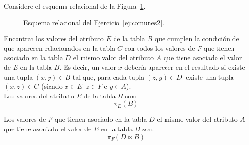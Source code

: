 \documentclass[12pt]{article}
\begin{document}
\begin{ejercicio}[AR]\label{ej:comunes2}
    Considere el esquema relacional de la Figura~\ref{fig:comunes2}.
    \begin{figure}[H]
        \centering
        \caption{Esquema relacional del Ejercicio~\ref{ej:comunes2}.}
        \label{fig:comunes2}
    \end{figure}

    Encontrar los valores del atributo $E$ de la tabla $B$ que cumplen la condición de que aparecen relacionados en la tabla $C$ con todos los valores de $F$ que tienen asociado en la tabla $D$ el mismo valor del atributo $A$ que tiene asociado el valor de $E$ en la tabla $B$. Es decir, un valor $x$ debería aparecer en el resultado si existe una tupla $(x,y)\in B$ tal que, para cada tupla $(z,y)\in D$, existe una tupla $(x,z)\in C$ (siendo $x\in E$, $z \in F$ e $y\in A$).\\

    Los valores del atributo $E$ de la tabla $B$ son:
    \begin{equation*}
        \pi_{E}(B)
    \end{equation*}

    Los valores de $F$ que tienen asociado en la tabla $D$ el mismo valor del atributo $A$ que tiene asociado el valor de $E$ en la tabla $B$ son:
    \begin{equation*}
        \pi_{F}(D \bowtie B)
    \end{equation*}


\end{ejercicio}
\end{document}
